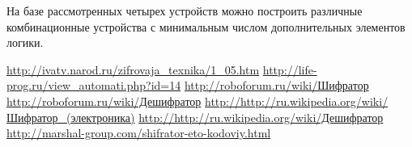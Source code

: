 На базе рассмотренных четырех устройств можно построить различные
комбинационные устройства с минимальным числом дополнительных элементов логики.

\newpage %
\renewcommand{\bibname}{Список источников}

\begin{thebibliography}{9} 
     \href{http://ivatv.narod.ru/zifrovaja\_texnika/1\_05.htm}
    {http://ivatv.narod.ru/zifrovaja\_texnika/1\_05.htm}
     \href{http://life-prog.ru/view\_automati.php?id=14}
    {http://life-prog.ru/view\_automati.php?id=14}
     \href{http://roboforum.ru/wiki/Шифратор}
    {http://roboforum.ru/wiki/Шифратор}
     \href{http://roboforum.ru/wiki/Дешифратор}
    {http://roboforum.ru/wiki/Дешифратор}
     \href{http://http://ru.wikipedia.org/wiki/Шифратор\_(электроника)}
    {http://http://ru.wikipedia.org/wiki/Шифратор\_(электроника)}
     \href{http://http://ru.wikipedia.org/wiki/Дешифратор}
    {http://http://ru.wikipedia.org/wiki/Дешифратор}
     \href{http://marshal-group.com/shifrator-eto-kodoviy.html}
    {http://marshal-group.com/shifrator-eto-kodoviy.html}
\end{thebibliography}